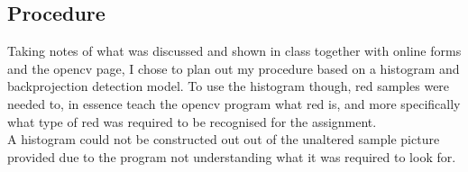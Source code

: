 \documentclass{article}
\begin{document}
\subsection{Procedure}\label{sec:intro}
Taking notes of what was discussed and shown in class together with online forms and the opencv page, I chose to plan out my procedure based on a histogram and backprojection detection model.
To use the histogram though, red samples were needed to, in essence teach the opencv program what red is, and more specifically what type of red was required to be recognised for the assignment.\\
A histogram could not be constructed out out of the unaltered sample picture provided due to the program not understanding what it was required to look for.\\
\end{document}
